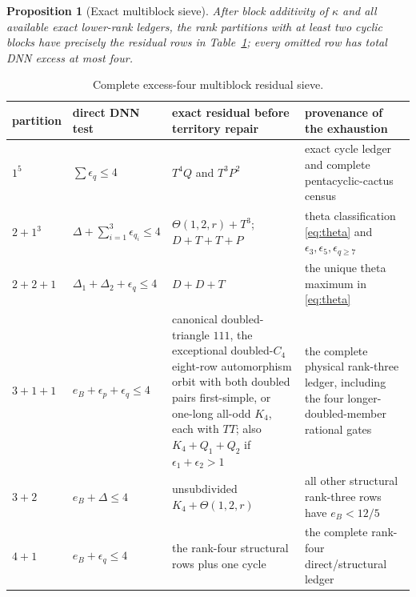 \documentclass[11pt]{article}
\newtheorem{proposition}[theorem]{Proposition}
\theoremstyle{remark}
\newcommand{\kap}{\kappa}
\begin{document}
\begin{proposition}[Exact multiblock sieve]\label{prop:sieve}
After block additivity of $\kap$ and all available exact lower-rank ledgers,
the rank partitions with at least two cyclic blocks have precisely the residual
rows in Table~\ref{tab:multi}; every omitted row has total DNN excess at most
four.
\end{proposition}

\begin{table}[p]
\centering\small
\begin{tabular}{p{1.25cm}p{3.1cm}p{4.4cm}p{4.5cm}}
\toprule
partition&direct DNN test&exact residual before territory repair&provenance of
the exhaustion\\
\midrule
$1^5$&$\sum\epsilon_q\le4$&$T^4Q$ and $T^3P^2$&exact cycle ledger and complete
pentacyclic-cactus census \cite{PentacyclicCactus}\\
$2+1^3$&$\Delta+\sum_{i=1}^3\epsilon_{q_i}\le4$&
$\Theta(1,2,r)+T^3$; $D+T+T+P$&theta classification
\eqref{eq:theta} and $\epsilon_3,\epsilon_5,\epsilon_{q\ge7}$\\
$2+2+1$&$\Delta_1+\Delta_2+\epsilon_q\le4$&$D+D+T$&the unique theta
maximum in \eqref{eq:theta}\\
$3+1+1$&$e_B+\epsilon_p+\epsilon_q\le4$&canonical doubled-triangle $111$,
the exceptional doubled-$C_4$ eight-row automorphism orbit with both doubled
pairs first-simple, or one-long all-odd $K_4$, each with $TT$; also
$K_4+Q_1+Q_2$ if $\epsilon_1+\epsilon_2>1$&the complete physical rank-three
ledger, including the four longer-doubled-member rational gates
\cite{Tetracyclic,OwnerClosure}\\
$3+2$&$e_B+\Delta\le4$&unsubdivided $K_4+\Theta(1,2,r)$&all other structural
rank-three rows have $e_B<12/5$\\
$4+1$&$e_B+\epsilon_q\le4$&the rank-four structural rows plus one cycle&the
complete rank-four direct/structural ledger \cite{Tetracyclic}\\
\bottomrule
\end{tabular}
\caption{Complete excess-four multiblock residual sieve.}\label{tab:multi}
\end{table}
\end{document}
